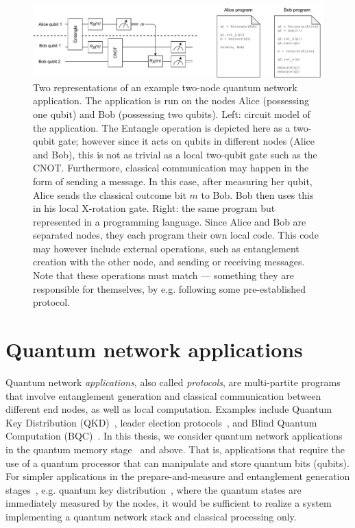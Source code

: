 \begin{figure}[t]
    \centering
    \includegraphics[width=1.0\linewidth]{figures/background/2node_circuit.pdf}
    \caption{
        Two representations of an example two-node quantum network application.
        The application is run on the nodes Alice (possessing one qubit) and Bob (possessing two qubits).
        Left: circuit model of the application.
        The Entangle operation is depicted here as a two-qubit gate; however since it acts on qubits in different nodes (Alice and Bob),
        this is not as trivial as a local two-qubit gate such as the CNOT.
        Furthermore, classical communication may happen in the form of sending a message.
        In this case, after measuring her qubit, Alice sends the classical outcome bit $m$ to Bob.
        Bob then uses this in his local X-rotation gate.
        Right: the same program but represented in a programming language.
        Since Alice and Bob are separated nodes, they each program their own local code.
        This code may however include external operations, such as entanglement creation with the other node, and sending or receiving messages.
        Note that these operations must match --- something they are responsible for themselves, by e.g. following some pre-established protocol.
    }
    \label{background:fig:2node_circuit}
\end{figure}

\section{Quantum network applications}
Quantum network \textit{applications}, also called \textit{protocols}, are multi-partite programs that involve entanglement generation and classical communication between different end nodes, as well as local computation.
Examples include Quantum Key Distribution (QKD)~\cite{bb84, ekert_1991_e91}, leader election protocols~\cite{kobayashi2014simpler, ganz2009quantum}, and Blind Quantum Computation (BQC)~\cite{Wehner2018stages}.
In this thesis, we consider quantum network applications in the quantum memory stage~\cite{wehner_2018_stages} and above. That is, applications that require the use of a quantum processor that can manipulate and store quantum bits (qubits). For simpler applications in the prepare-and-measure and entanglement generation stages~\cite{wehner_2018_stages}, e.g. quantum key distribution~\cite{bb84Original,ekert_1991_e91}, where the quantum states are immediately measured by the nodes, it would be sufficient to realize a system implementing a quantum network stack and classical processing only.


